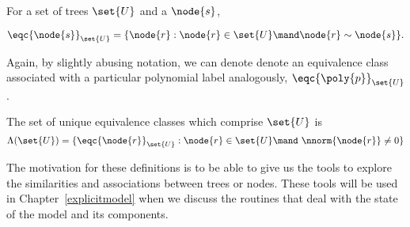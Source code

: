 For a set of trees $\set{U}$ and a $\node{s}$,
\begin{definition}
  \begin{equation*}
    \eqc{\node{s}}_{\set{U}} = \{\node{r}: \node{r}\in\set{U} \mand \node{r}\sim\node{s}\}.
  \end{equation*}
\end{definition}
Again, by slightly abusing notation, we can denote denote an
equivalence class associated with a particular polynomial label
analogously, $\eqc{\poly{p}}_{\set{U}}$.

\begin{definition}
The set of unique
equivalence classes which comprise $\set{U}$ is
  \begin{equation}
    \Lambda(\set{U}) = \{\eqc{\node{r}}_{\set{U}}: \node{r}\in\set{U} \mand\ \nnorm{\node{r}} \neq 0\}
  \end{equation}
\end{definition}

The motivation for these definitions is to be able to give us the
tools to explore the similarities and associations between trees or
nodes. These tools will be used in Chapter~\ref{explicitmodel} when we
discuss the routines that deal with the state of the model and its
components.



